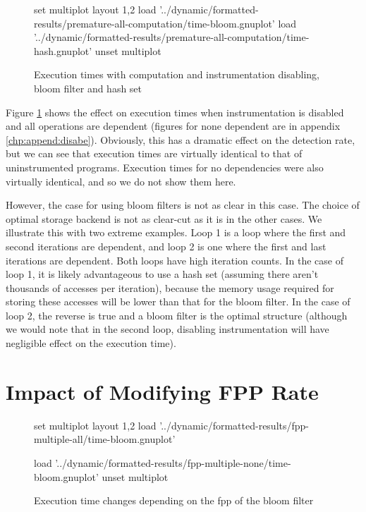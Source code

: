 \begin{figure}
	\centering
	\begin{gnuplot}[terminal=pdf]
	set multiplot layout 1,2
		load '../dynamic/formatted-results/premature-all-computation/time-bloom.gnuplot'
		load '../dynamic/formatted-results/premature-all-computation/time-hash.gnuplot'
	unset multiplot
	\end{gnuplot}
	\caption{Execution times with computation and instrumentation disabling, bloom filter and hash set}
	\label{chart:premature-all}
\end{figure}

Figure \ref{chart:premature-all} shows the effect on execution times when instrumentation is disabled and all operations are dependent (figures for none dependent are in appendix \ref{chp:append:disabe}). Obviously, this has a dramatic effect on the detection rate, but we can see that execution times are virtually identical to that of uninstrumented programs. Execution times for no dependencies were also virtually identical, and so we do not show them here.

However, the case for using bloom filters is not as clear in this case. The choice of optimal storage backend is not as clear-cut as it is in the other cases. We illustrate this with two extreme examples. Loop 1 is a loop where the first and second iterations are dependent, and loop 2 is one where the first and last iterations are dependent. Both loops have high iteration counts. In the case of loop 1, it is likely advantageous to use a hash set (assuming there aren't thousands of accesses per iteration), because the memory usage required for storing these accesses will be lower than that for the bloom filter. In the case of loop 2, the reverse is true and a bloom filter is the optimal structure (although we would note that in the second loop, disabling instrumentation will have negligible effect on the execution time).

\section{Impact of Modifying FPP Rate} \label{sec:results/fpp}

\begin{figure}
	\centering
	\begin{gnuplot}[terminal=pdf]
	set multiplot layout 1,2
		load '../dynamic/formatted-results/fpp-multiple-all/time-bloom.gnuplot'
		
		load '../dynamic/formatted-results/fpp-multiple-none/time-bloom.gnuplot'
	unset multiplot
	\end{gnuplot}
	\caption{Execution time changes depending on the fpp of the bloom filter}
	\label{chart:fpp-time}
\end{figure}


